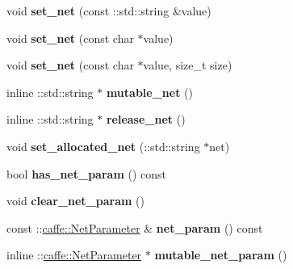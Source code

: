 \begin{DoxyCompactItemize}
void {\bfseries set\+\_\+net} (const \+::std\+::string \&value)
\item 
\mbox{\label{classcaffe_1_1_solver_parameter_a86a0475ed266802490f641164334d13d}} 
void {\bfseries set\+\_\+net} (const char $\ast$value)
\item 
\mbox{\label{classcaffe_1_1_solver_parameter_a671e0b93077c1246a82eaa5731c93246}} 
void {\bfseries set\+\_\+net} (const char $\ast$value, size\+\_\+t size)
\item 
\mbox{\label{classcaffe_1_1_solver_parameter_ac1eca9637b3fc7355d89b163f6807c13}} 
inline \+::std\+::string $\ast$ {\bfseries mutable\+\_\+net} ()
\item 
\mbox{\label{classcaffe_1_1_solver_parameter_a51a37df33a390271ccfba8edfde4886e}} 
inline \+::std\+::string $\ast$ {\bfseries release\+\_\+net} ()
\item 
\mbox{\label{classcaffe_1_1_solver_parameter_a7d74b0ebd755c412f69edbf5cf7b2557}} 
void {\bfseries set\+\_\+allocated\+\_\+net} (\+::std\+::string $\ast$net)
\item 
\mbox{\label{classcaffe_1_1_solver_parameter_a3db057fb4ef4e1ed1f714d9437055df9}} 
bool {\bfseries has\+\_\+net\+\_\+param} () const
\item 
\mbox{\label{classcaffe_1_1_solver_parameter_a7d81d9152723a70653d2a8ea1299eea5}} 
void {\bfseries clear\+\_\+net\+\_\+param} ()
\item 
\mbox{\label{classcaffe_1_1_solver_parameter_abe4a8b5054a0314e7223fd06354026dc}} 
const \+::\mbox{\hyperlink{classcaffe_1_1_net_parameter}{caffe\+::\+Net\+Parameter}} \& {\bfseries net\+\_\+param} () const
\item 
\mbox{\label{classcaffe_1_1_solver_parameter_a68f9022f8871539c1dc7b622fbf05e7e}} 
inline \+::\mbox{\hyperlink{classcaffe_1_1_net_parameter}{caffe\+::\+Net\+Parameter}} $\ast$ {\bfseries mutable\+\_\+net\+\_\+param} ()

\end{DoxyCompactItemize}

